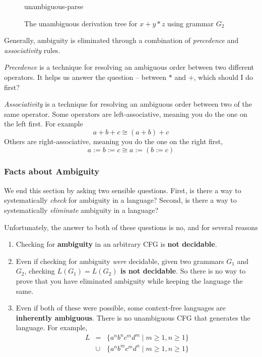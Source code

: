\begin{figure}[H]
    \centering
    {unambiguous-parse}
    \caption{The unambiguous derivation tree for $x+y*z$ using grammar $G_2$}
    \label{figure:unambiguous-parse}
\end{figure}

Generally, ambiguity is eliminated through a combination of \textit{precedence} and \textit{associativity} rules. 

\textit{Precedence} is a technique for resolving an ambiguous order between two different operators. It helps us answer the question -- between $*$ and $+$, which should I do first?

\textit{Associativity} is a technique for resolving an ambiguous order between two of the same operator. Some operators are left-associative, meaning you do the one on the left first. For example
\[a + b + c \cong (a + b) + c\]
Others are right-associative, meaning you do the one on the right first,
\[a := b := c \cong a:= (b := c) \]
\subsubsection{Facts about Ambiguity}
We end this section by asking two sensible questions. First, is there a way to systematically \textit{check} for ambiguity in a language? Second, is there a way to systematically \textit{eliminate} ambiguity in a language?

Unfortunately, the answer to both of these questions is no, and for several reasons
\begin{enumerate}
\item Checking for \textbf{ambiguity} in an arbitrary CFG is \textbf{not decidable}.
\item Even if checking for ambiguity \textit{were} decidable, given two grammars $G_1$ and $G_2$, checking
\textbf{$L(G_1) = L(G_2)$ is not decidable}. So there is no way to prove that you have eliminated ambiguity while keeping the language the same.
\item Even if both of these were possible, some context-free languages are \textbf{inherently ambiguous}. There is no unambiguous CFG that generates the language. For example,
\[
\begin{array}{lll}
  L &=& \{ a^nb^nc^md^m \mid m \ge 1, n \ge 1 \}\\
  &\cup& \{ a^nb^mc^md^n \mid m \ge 1, n \ge 1 \}
\end{array}
\]
\end{enumerate}

